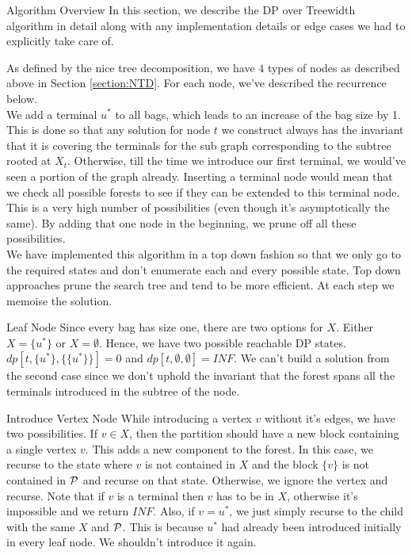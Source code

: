 
\begin{section}{Algorithm Overview}
	In this section, we describe the DP over Treewidth algorithm in detail along with any implementation details or edge cases we had to explicitly take care of. 
	
	As defined by the nice tree decomposition, we have $4$ types of nodes as described above in Section \ref{section:NTD}. For each node, we've described the recurrence below. \\
	
	We add a terminal $u^*$ to all bags, which leads to an increase of the bag size by 1. This is done so that any solution for node $t$ we construct always has the invariant that it is covering the terminals for the sub graph corresponding to the subtree rooted at $X_t$. Otherwise, till the time we introduce our first terminal, we would've seen a portion of the graph already. Inserting a terminal node would mean that we check all possible forests to see if they can be extended to this terminal node. This is a very high number of possibilities (even though it's asymptotically the same). By adding that one node in the beginning, we prune off all these possibilities. \\
	
	We have implemented this algorithm in a top down fashion so that we only go to the required states and don't enumerate each and every possible state. Top down approaches prune the search tree and tend to be more efficient. At each step we memoise the solution. \\
	
	\begin{subsection}{Leaf Node}
		Since every bag has size one, there are two options for $X$. Either $X=\{u^*\}$ or $X= \emptyset$. Hence, we have two possible reachable DP states. $dp[t, \{u^*\}, \{\{u^*\}\}] = 0$ and $dp[t, \emptyset, \emptyset] = INF$. We can't build a solution from the second case since we don't uphold the invariant that the forest spans all the terminals introduced in the subtree of the node. 
	\end{subsection}

	\begin{subsection}{Introduce Vertex Node}
		While introducing a vertex $v$ without it's edges, we have two possibilities. If $v \in X$, then the partition should have a new block containing a single vertex $v$. This adds a new component to the forest. In this case, we recurse to the state where $v$ is not contained in $X$ and the block $\{v\}$ is not contained in $\mathcal{P}$ and recurse on that state. Otherwise, we ignore the vertex and recurse. Note that if $v$ is a terminal then $v$ has to be in $X$, otherwise it's impossible and we return $INF$. Also, if $v = u^*$, we just simply recurse to the child with the same $X$ and $\mathcal{P}$. This is because $u^*$ had already been introduced initially in every leaf node. We shouldn't introduce it again. 
		

\end{subsection}
\end{section}
